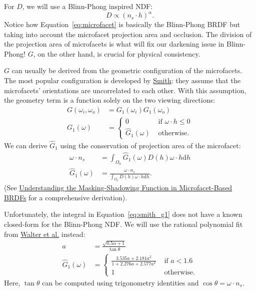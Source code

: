 For $D$, we will use a Blinn-Phong inspired NDF:
\begin{equation}
D \propto \left(n_s \cdot h\right)^{\alpha}.
\label{eq:blinn_NDF}
\end{equation}
Notice how Equation~\eqref{eq:microfacet} is basically the Blinn-Phong BRDF but taking into account the microfacet projection area and occlusion.
The division of the projection area of microfacets is what will fix our darkening issue in Blinn-Phong!
$G$, on the other hand, is crucial for physical consistency.

$G$ can usually be derived from the geometric configuration of the microfacets. The most popular configuration is developed by \href{https://ieeexplore.ieee.org/document/1138991}{Smith}: they assume that the microfacets' orientations are uncorrelated to each other. With this assumption, the geometry term is a function solely on the two viewing directions: 
\begin{equation}
\begin{aligned}
G(\omega_i, \omega_o) &= G_1(\omega_i) G_1(\omega_o) \\
G_1(\omega) &= \begin{cases}
0 & \text{ if } \omega \cdot h \leq 0 \\
\hat{G}_1(\omega) & \text{ otherwise.}
\end{cases}
\end{aligned}
\end{equation}
We can derive $\hat{G}_1$ using the conservation of projection area of the microfacet:
\begin{equation}
\begin{aligned}
\omega \cdot n_s &= \int_{\Omega_h} \hat{G}_1(\omega) D(h) \omega \cdot h \mathrm{d} h \\
\hat{G}_1(\omega) &= \frac{\omega \cdot n_s}{\int_{\Omega_h} D(h) \omega \cdot h \mathrm{d} h}. 
\label{eq:smith_g1}
\end{aligned}
\end{equation}
(See \href{https://jcgt.org/published/0003/02/03/}{Understanding the Masking-Shadowing Function in Microfacet-Based BRDFs} for a comprehensive derivation).

Unfortunately, the integral in Equation~\eqref{eq:smith_g1} does not have a known closed-form for the Blinn-Phong NDF. We will use the rational polynomial fit from \href{http://www.graphics.cornell.edu/~bjw/microfacetbsdf.pdf}{Walter et al.} instead:
\begin{equation}
\begin{aligned}
a &= \frac{\sqrt{0.5 \alpha + 1}}{\tan\theta} \\
\hat{G}_1(\omega) &= \begin{cases}
\frac{3.535a + 2.181a^2}{1 + 2.276a + 2.577a^2} & \text{ if } a < 1.6 \\
1 & \text{ otherwise.}
\end{cases}
\end{aligned}
\end{equation}
Here, $\tan\theta$ can be computed using trigonometry identities and $\cos\theta = \omega \cdot n_s$.

